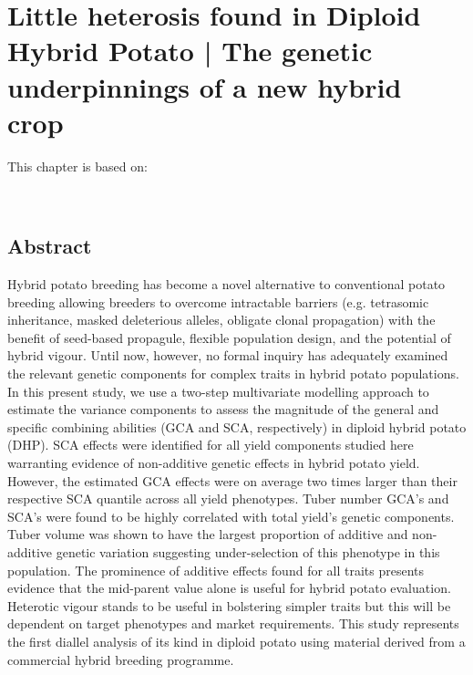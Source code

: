 \usepackage{bibentry}  %

\chapter[Little heterosis found in Diploid Hybrid Potato | The genetic underpinnings of a new hybrid crop]{Little heterosis found in Diploid Hybrid Potato | The genetic underpinnings of a new hybrid crop}


\label{cha:chapter2}
\vspace*{\fill}
This chapter is based on:
\\
\begin{quote}
\end{quote}

\\
\newpage

\section*{Abstract}
 Hybrid potato breeding has become a novel alternative to conventional potato breeding allowing breeders to overcome intractable barriers (e.g. tetrasomic inheritance, masked deleterious alleles, obligate clonal propagation) with the benefit of seed-based propagule, flexible population design, and the potential of hybrid vigour. Until now, however, no formal inquiry has adequately examined the relevant genetic components for complex traits in hybrid potato populations. In this present study, we use a two-step multivariate modelling approach to estimate the variance components to assess the magnitude of the general and specific combining abilities (GCA and SCA, respectively) in diploid hybrid potato (DHP). SCA effects were identified for all yield components studied here warranting evidence of non-additive genetic effects in hybrid potato yield. However, the estimated GCA effects were on average two times larger than their respective SCA quantile across all yield phenotypes. Tuber number GCA’s and SCA’s were found to be highly correlated with total yield's genetic components. Tuber volume was shown to have the largest proportion of additive and non-additive genetic variation suggesting under-selection of this phenotype in this population. The prominence of additive effects found for all traits presents evidence that the mid-parent value alone is useful for hybrid potato evaluation. Heterotic vigour stands to be useful in bolstering simpler traits but this will be dependent on target phenotypes and market requirements. This study represents the first diallel analysis of its kind in diploid potato using material derived from a commercial hybrid breeding programme.

